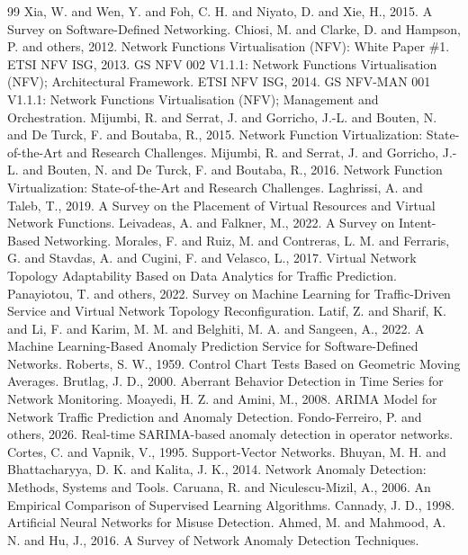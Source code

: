 \documentclass[12pt,a4paper]{article}
\begin{document}
\begin{thebibliography}{99}
 Xia, W. and Wen, Y. and Foh, C. H. and Niyato, D. and Xie, H., 2015. A Survey on Software-Defined Networking.
 Chiosi, M. and Clarke, D. and Hampson, P. and others, 2012. Network Functions Virtualisation (NFV): White Paper \#1.
 ETSI NFV ISG, 2013. GS NFV 002 V1.1.1: Network Functions Virtualisation (NFV); Architectural Framework.
 ETSI NFV ISG, 2014. GS NFV-MAN 001 V1.1.1: Network Functions Virtualisation (NFV); Management and Orchestration.
 Mijumbi, R. and Serrat, J. and Gorricho, J.-L. and Bouten, N. and De Turck, F. and Boutaba, R., 2015. Network Function Virtualization: State-of-the-Art and Research Challenges.
 Mijumbi, R. and Serrat, J. and Gorricho, J.-L. and Bouten, N. and De Turck, F. and Boutaba, R., 2016. Network Function Virtualization: State-of-the-Art and Research Challenges.
 Laghrissi, A. and Taleb, T., 2019. A Survey on the Placement of Virtual Resources and Virtual Network Functions.
 Leivadeas, A. and Falkner, M., 2022. A Survey on Intent-Based Networking.
 Morales, F. and Ruiz, M. and Contreras, L. M. and Ferraris, G. and Stavdas, A. and Cugini, F. and Velasco, L., 2017. Virtual Network Topology Adaptability Based on Data Analytics for Traffic Prediction.
 Panayiotou, T. and others, 2022. Survey on Machine Learning for Traffic-Driven Service and Virtual Network Topology Reconfiguration.
 Latif, Z. and Sharif, K. and Li, F. and Karim, M. M. and Belghiti, M. A. and Sangeen, A., 2022. A Machine Learning-Based Anomaly Prediction Service for Software-Defined Networks.
 Roberts, S. W., 1959. Control Chart Tests Based on Geometric Moving Averages.
 Brutlag, J. D., 2000. Aberrant Behavior Detection in Time Series for Network Monitoring.
 Moayedi, H. Z. and Amini, M., 2008. ARIMA Model for Network Traffic Prediction and Anomaly Detection.
 Fondo-Ferreiro, P. and others, 2026. Real-time SARIMA-based anomaly detection in operator networks.
 Cortes, C. and Vapnik, V., 1995. Support-Vector Networks.
 Bhuyan, M. H. and Bhattacharyya, D. K. and Kalita, J. K., 2014. Network Anomaly Detection: Methods, Systems and Tools.
 Caruana, R. and Niculescu-Mizil, A., 2006. An Empirical Comparison of Supervised Learning Algorithms.
 Cannady, J. D., 1998. Artificial Neural Networks for Misuse Detection.
 Ahmed, M. and Mahmood, A. N. and Hu, J., 2016. A Survey of Network Anomaly Detection Techniques.

\end{thebibliography}
\end{document}
